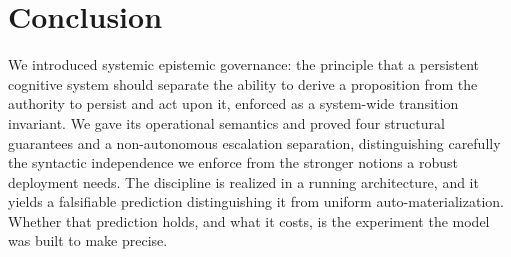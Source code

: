 \documentclass[11pt]{article}
\theoremstyle{plain}
\theoremstyle{definition}
\begin{document}
\section{Conclusion}

We introduced systemic epistemic governance: the principle that a persistent
cognitive system should separate the ability to derive a proposition from the
authority to persist and act upon it, enforced as a system-wide transition
invariant. We gave its operational semantics and proved four structural
guarantees and a non-autonomous escalation separation, distinguishing carefully
the syntactic independence we enforce from the stronger notions a robust
deployment needs. The discipline is realized in a running architecture, and it
yields a falsifiable prediction distinguishing it from uniform auto-materialization.
Whether that prediction holds, and what it costs, is the experiment the model was
built to make precise.
\end{document}
